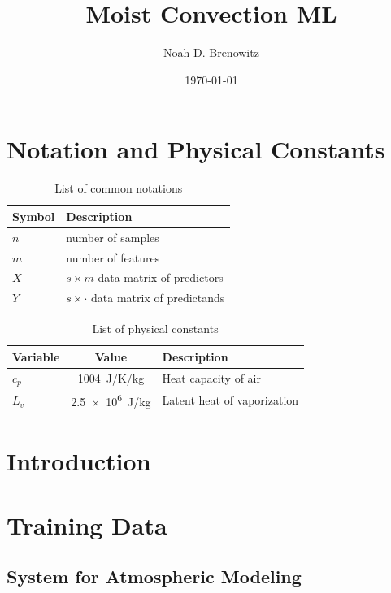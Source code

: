 \documentclass{report}
\title{Moist Convection ML}
\author{Noah D. Brenowitz}
\date{\today}
\begin{document}
\maketitle
\tableofcontents

\chapter*{Notation and Physical Constants}
\label{ch:notation}
\begin{table}
  \centering
  \begin{tabularx}{\textwidth}{lX}
    \toprule
    Symbol & Description\\
    \toprule
    $n$ & number of samples \\
    $m$ &  number of features\\
    $X$ & $s \times m$ data matrix of predictors\\
    $Y$ & $s \times \cdot $ data matrix of predictands\\
    \bottomrule
  \end{tabularx}
  
  \caption{List of common notations}
  \label{tab:constants}
\end{table}

\begin{table}
  \centering
  \begin{tabularx}{\textwidth}{lcX}
    \toprule
    Variable & Value & Description\\
    \toprule
    $c_p$ & \SI{1004}{J/K/kg} & Heat capacity of air\\
    $L_v$ & \SI{2.5e6}{J/kg} & Latent heat of vaporization\\
    \bottomrule
  \end{tabularx}
  
  \caption{List of physical constants}
  \label{tab:constants}
\end{table}
\chapter{Introduction}

\chapter{Training Data}

\section{System for Atmospheric Modeling}
\label{sec:sam}
\end{document}
